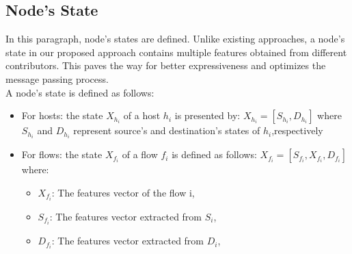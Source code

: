\subsection{Node's State}
In this paragraph, node's states are defined. Unlike existing approaches, a node's state in our proposed approach  contains multiple features obtained from different contributors. This paves the way for better expressiveness and optimizes the message passing process. \\
A node's state is defined as follows:
\begin{itemize}
    \item For hosts: the state $X_{h_i}$ of a host $h_i$ is presented by: $X_{h_i} = [S_{h_i} , D_{h_i}]$ where $S_{h_i}$ and $D_{h_i}$ represent source's and destination's states of $h_i$,respectively
    \item For flows: the state $X_{f_i}$ of a flow $f_i$ is defined as follows: $X_{f_i} = [S_{f_i},  X_{f_i},  D_{f_i} ]$ where:
    \begin{itemize}
        \item $X_{f_i}$: The features vector of the flow i,
        \item $S_{f_i}$: The features vector extracted from $S_i$,
        \item $D_{f_i}$: The features vector extracted from $D_i$,
    \end{itemize}

\end{itemize}

